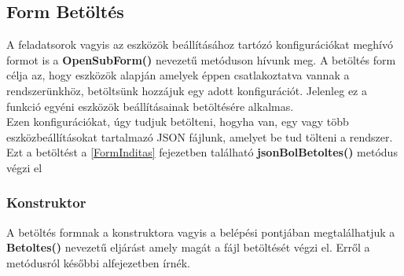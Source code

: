 \documentclass[tocnopagenum]{thesis-ekf}
\theoremstyle{definition}
\theoremstyle{remark}
\begin{document}
	\subsection{Form Betöltés}
	\label{Form Betoltes}
	A feladatsorok vagyis az eszközök beállításához tartózó konfigurációkat meghívó formot is a \textbf{OpenSubForm()} nevezetű metóduson hívunk meg. A betöltés form célja az, hogy eszközök alapján amelyek éppen csatlakoztatva vannak a rendszerünkhöz, betöltsünk hozzájuk egy adott konfigurációt.
	Jelenleg ez a funkció egyéni eszközök beállításainak betöltésére alkalmas.
	\\
	Ezen konfigurációkat, úgy tudjuk betölteni, hogyha van, egy vagy több eszközbeállításokat tartalmazó JSON fájlunk, amelyet be tud tölteni a rendszer. Ezt a betöltést a \ref{FormInditas} fejezetben található \textbf{jsonBolBetoltes()} metódus végzi el
	\subsubsection{Konstruktor}
	A betöltés formnak a konstruktora vagyis a belépési pontjában megtalálhatjuk a \textbf{Betoltes()} nevezetű eljárást amely magát a fájl betöltését végzi el. Erről a metódusról későbbi alfejezetben írnék.
\end{document}
